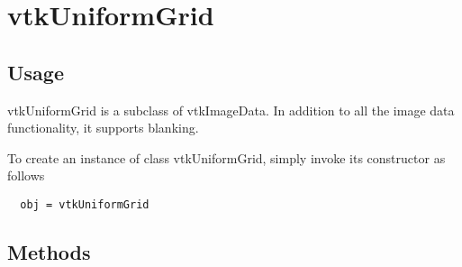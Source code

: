 \section{vtkUniformGrid}

\subsection{Usage}

 vtkUniformGrid is a subclass of vtkImageData. In addition to all
 the image data functionality, it supports blanking.

To create an instance of class vtkUniformGrid, simply
invoke its constructor as follows
\begin{verbatim}
  obj = vtkUniformGrid
\end{verbatim}
\subsection{Methods}

